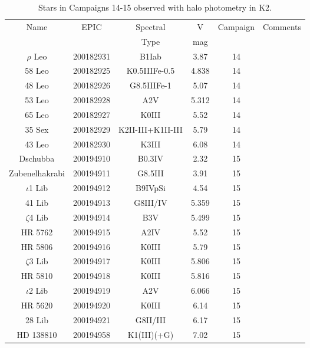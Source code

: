 \begin{table*}
\caption{Stars in Campaigns 14-15 observed with halo photometry in K2.\label{table_4}}
\begin{tabular}{cccccc}
\hline \hline
Name & EPIC & Spectral & V & Campaign & Comments \\
 &  & Type & mag &  &  \\
\hline
$\rho$ Leo & 200182931 & B1Iab & 3.87 & 14 & \citet{Aerts2018} \\
58 Leo & 200182925 & K0.5IIIFe-0.5 & 4.838 & 14 &  \\
48 Leo & 200182926 & G8.5IIIFe-1 & 5.07 & 14 &  \\
53 Leo & 200182928 & A2V & 5.312 & 14 &  \\
65 Leo & 200182927 & K0III & 5.52 & 14 &  \\
35 Sex & 200182929 & K2II-III+K1II-III & 5.79 & 14 &  \\
43 Leo & 200182930 & K3III & 6.08 & 14 &  \\
Dschubba & 200194910 & B0.3IV & 2.32 & 15 &  \\
Zubenelhakrabi & 200194911 & G8.5III & 3.91 & 15 &  \\
$\iota$1 Lib & 200194912 & B9IVpSi & 4.54 & 15 & \citet{Buysschaert2018} \\
41 Lib & 200194913 & G8III/IV & 5.359 & 15 &  \\
$\zeta$4 Lib & 200194914 & B3V & 5.499 & 15 &  \\
HR 5762 & 200194915 & A2IV & 5.52 & 15 &  \\
HR 5806 & 200194916 & K0III & 5.79 & 15 &  \\
$\zeta$3 Lib & 200194917 & K0III & 5.806 & 15 &  \\
HR 5810 & 200194918 & K0III & 5.816 & 15 &  \\
$\iota$2 Lib & 200194919 & A2V & 6.066 & 15 & \citet{Buysschaert2018} \\
HR 5620 & 200194920 & K0III & 6.14 & 15 &  \\
28 Lib & 200194921 & G8II/III & 6.17 & 15 &  \\
HD 138810 & 200194958 & K1(III)(+G) & 7.02 & 15 &  \\
\hline
\end{tabular}
\end{table*}
